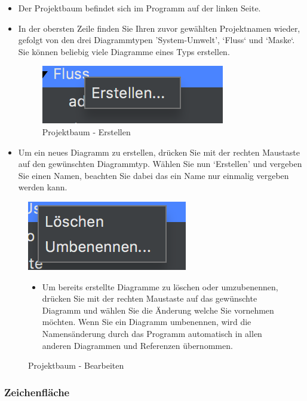 \begin{itemize}
\item Der Projektbaum befindet sich im Programm auf der linken Seite.
\item In der obersten Zeile finden Sie Ihren zuvor gewählten Projektnamen wieder, gefolgt von den drei Diagrammtypen 'System-Umwelt', ‘Fluss‘ und ‘Maske‘. Sie können beliebig viele Diagramme eines Typs erstellen.

\begin{figure}[h!]
	\centering
	\includegraphics[width=.4\textwidth]{Projektbaum_Erstellen.png}
	\caption{Projektbaum - Erstellen}
\end{figure}

\item Um ein neues Diagramm zu erstellen, drücken Sie mit der rechten Maustaste auf den gewünschten Diagrammtyp. Wählen Sie nun ‘Erstellen' und vergeben Sie einen Namen, beachten Sie dabei das ein Name nur einmalig vergeben werden kann. 
\end{itemize}

\begin{figure}[h!]
	\centering
	\includegraphics[width=.4\textwidth]{Projektbaum_Bearbeiten.png}
	\caption{Projektbaum - Bearbeiten}
\begin{itemize}	
\item Um bereits erstellte Diagramme zu löschen oder umzubenennen, drücken Sie mit der rechten Maustaste auf das gewünschte Diagramm und wählen Sie die Änderung welche Sie vornehmen möchten. Wenn Sie ein Diagramm umbenennen, wird die Namensänderung durch das Programm automatisch in allen anderen Diagrammen und Referenzen übernommen.
\end{itemize}
\end{figure}




\subsubsection{Zeichenfläche}




